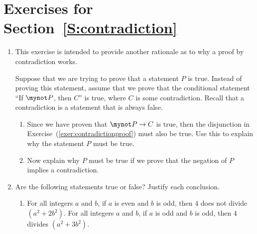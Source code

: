 \section*{Exercises for Section~\ref{S:contradiction}}
\begin{enumerate}
%


\item This exercise is intended to provide another rationale as to why a proof by contradiction works.
\label{exer:sec33-1}%

Suppose that we are trying to prove that a statement $P$ is true.  Instead of proving this statement, assume that we prove that the conditional statement ``If $\mynot P$, then $C$'' is true, where  $C$ is some contradiction.  Recall that a contradiction is a statement that is always false.
\begin{enumerate}
  \yitem In symbols, write a statement that is a disjunction and that is logically equivalent to $\mynot P \to C$.
\label{exer:contradictionproof}%

  \item Since we have proven that $\mynot P \to C$ is true, then the disjunction in Exercise~(\ref{exer:contradictionproof}) must also be true.  Use this to explain why the statement $P$ must be true.

  \item Now explain why $P$ must be true if we prove that the negation of  $P$  implies a contradiction. 
\end{enumerate}

\item Are the following statements true or false?  Justify each conclusion. \label{exer:sec32-truefalse}
\begin{enumerate}
\yitem For all integers $a$ and $b$, if $a$ is even and $b$ is odd, then 
$4$ does not divide $\left( a^2 + b^2 \right)$.
\yitem For all integers $a$ and $b$, if $a$ is even and $b$ is odd, then 
$6$ does not divide $\left( a^2 + b^2 \right)$.
\item For all integers $a$ and $b$, if $a$ is even and $b$ is odd, then 
$4$ does not divide $\left( a^2 + 2b^2 \right)$.
\yitem For all integers $a$ and $b$, if $a$ is odd and $b$ is odd, then 
$4$ divides $\left( a^2 + 3b^2 \right)$.
\end{enumerate}


\end{enumerate}
